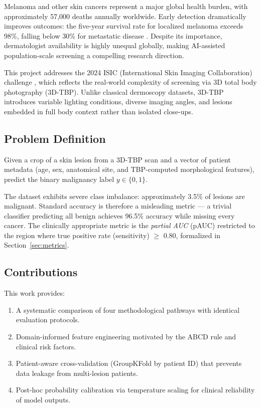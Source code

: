 \documentclass[12pt, a4paper]{article}
\begin{document}
Melanoma and other skin cancers represent a major global health burden,
with approximately 57,000 deaths annually worldwide.
Early detection dramatically improves outcomes: the five-year survival rate
for localized melanoma exceeds 98\%, falling below 30\% for metastatic disease
\citep{siegel2023cancer}.
Despite its importance, dermatologist availability is highly unequal globally,
making AI-assisted population-scale screening a compelling research direction.

This project addresses the 2024 ISIC (International Skin Imaging Collaboration)
challenge \citep{kurtansky2024slice}, which reflects the real-world complexity
of screening via 3D total body photography (3D-TBP).
Unlike classical dermoscopy datasets, 3D-TBP introduces variable lighting
conditions, diverse imaging angles, and lesions embedded in full body context
rather than isolated close-ups.

\subsection{Problem Definition}

Given a crop of a skin lesion from a 3D-TBP scan and a vector of patient metadata
(age, sex, anatomical site, and TBP-computed morphological features), predict
the binary malignancy label $y \in \{0, 1\}$.

The dataset exhibits severe class imbalance:
approximately 3.5\% of lesions are malignant.
Standard accuracy is therefore a misleading metric — a trivial classifier
predicting all benign achieves 96.5\% accuracy while missing every cancer.
The clinically appropriate metric is the \emph{partial AUC} (pAUC) restricted to
the region where true positive rate (sensitivity) $\geq$ 0.80, formalized in
Section~\ref{sec:metrics}.

\subsection{Contributions}

This work provides:
\begin{enumerate}
    \item A systematic comparison of four methodological pathways with identical
          evaluation protocols.
    \item Domain-informed feature engineering motivated by the ABCD rule
          and clinical risk factors.
    \item Patient-aware cross-validation (GroupKFold by patient ID) that
          prevents data leakage from multi-lesion patients.
    \item Post-hoc probability calibration via temperature scaling for
          clinical reliability of model outputs.
\end{enumerate}
\end{document}
